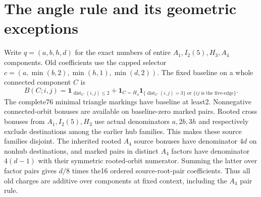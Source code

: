 \documentclass[11pt]{article}
\begin{document}
\section{The angle rule and its geometric exceptions}
Write $q=(a,b,h,d)$ for the exact numbers of entire
$A_1,I_2(5),H_3,A_4$ components. Old coefficients use the capped selector
$c=(a,\min(b,2),\min(h,1),\min(d,2))$.
The fixed baseline on a whole connected component $C$ is
\[
 B(C;i,j)=\mathbf1_{\operatorname{dist}_C(i,j)\le2}
 +\mathbf1_{C=H_4}\mathbf1_{\{\operatorname{dist}_C(i,j)=3\}
                      \text{ or }\{ij\text{ is the five-edge}\}}.
\]
The complete76 minimal triangle markings have baseline at least2.
Nonnegative connected-orbit bonuses are available on baseline-zero
marked pairs. Rooted cross bonuses from $A_1,I_2(5),H_3$ use actual
denominators $a,2b,3h$ and respectively exclude destinations among the
earlier hub families. This makes these source families disjoint. The
inherited rooted $A_4$ source bonuses have denominator $4d$ on nonhub
destinations, and marked pairs in distinct $A_4$ factors have denominator
$4(d-1)$ with their symmetric rooted-orbit numerator. Summing the latter
over factor pairs gives $d/8$ times the16 ordered source-root-pair
coefficients. Thus all old charges are additive over components at fixed
context, including the $A_4$ pair rule.
\end{document}
